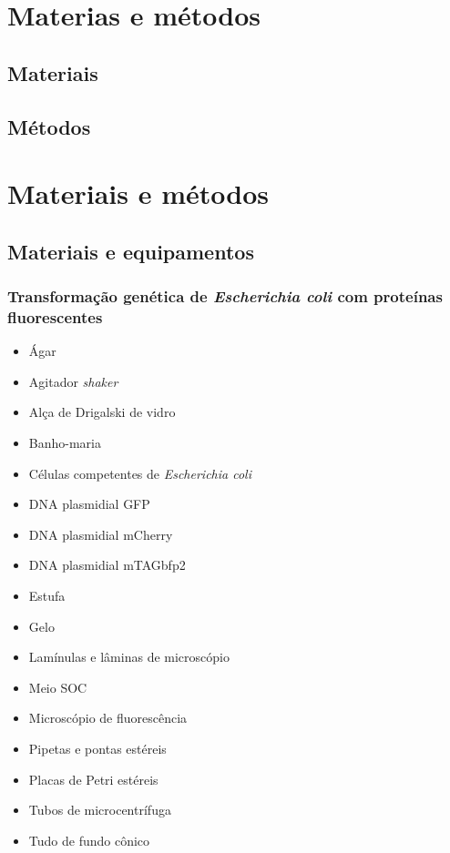 \section{Materias e métodos}
\subsection{Materiais}

\subsection{Métodos}
\section{Materiais e métodos}
\subsection{Materiais e equipamentos}
\subsubsection{Transformação genética de \textit{Escherichia coli} com proteínas
	fluorescentes}
\begin{itemize}[label=\boldmath\(\cdot\)]%
    \item Ágar %
    \item Agitador \textit{shaker} %
    \item Alça de Drigalski de vidro %
    \item Banho-maria %
    \item Células competentes de \textit{Escherichia coli} %
    \item DNA plasmidial GFP
    \item DNA plasmidial mCherry
    \item DNA plasmidial mTAGbfp2
    \item Estufa %
    \item Gelo %
    \item Lamínulas e lâminas de microscópio %
    \item Meio SOC %
    \item Microscópio de fluorescência %
    \item Pipetas e pontas estéreis %
    \item Placas de Petri estéreis %
    \item Tubos de microcentrífuga %
    \item Tudo de fundo cônico %
\end{itemize}

